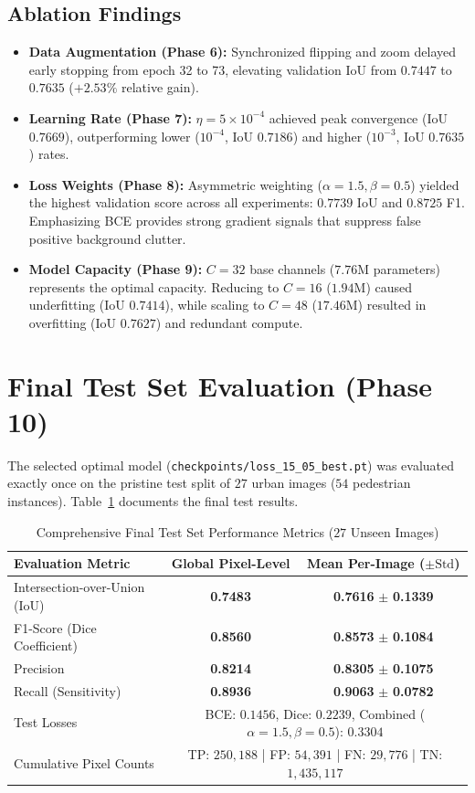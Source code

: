 \documentclass[10pt,a4paper]{report}
\begin{document}
\subsection{Ablation Findings}
\begin{itemize}
    \item \textbf{Data Augmentation (Phase 6):} Synchronized flipping and zoom delayed early stopping from epoch 32 to 73, elevating validation IoU from $0.7447$ to $0.7635$ ($+2.53\%$ relative gain).
    \item \textbf{Learning Rate (Phase 7):} $\eta = 5\times 10^{-4}$ achieved peak convergence (IoU $0.7669$), outperforming lower ($10^{-4}$, IoU $0.7186$) and higher ($10^{-3}$, IoU $0.7635$) rates.
    \item \textbf{Loss Weights (Phase 8):} Asymmetric weighting ($\alpha=1.5, \beta=0.5$) yielded the highest validation score across all experiments: $\mathbf{0.7739}$ IoU and $\mathbf{0.8725}$ F1. Emphasizing BCE provides strong gradient signals that suppress false positive background clutter.
    \item \textbf{Model Capacity (Phase 9):} $C=32$ base channels ($7.76$M parameters) represents the optimal capacity. Reducing to $C=16$ ($1.94$M) caused underfitting (IoU $0.7414$), while scaling to $C=48$ ($17.46$M) resulted in overfitting (IoU $0.7627$) and redundant compute.
\end{itemize}

\section{Final Test Set Evaluation (Phase 10)}
The selected optimal model (\texttt{checkpoints/loss\_15\_05\_best.pt}) was evaluated exactly once on the pristine test split of $27$ urban images ($54$ pedestrian instances). Table~\ref{tab:test_metrics} documents the final test results.

\begin{table}[htbp]
\centering
\small
\caption{Comprehensive Final Test Set Performance Metrics ($27$ Unseen Images)}
\label{tab:test_metrics}
\begin{tabular}{lcc}
\toprule
\textbf{Evaluation Metric} & \textbf{Global Pixel-Level} & \textbf{Mean Per-Image ($\pm \text{Std}$)} \\
\midrule
Intersection-over-Union (IoU) & \textbf{0.7483} & \textbf{0.7616} $\pm$ \textbf{0.1339} \\
F1-Score (Dice Coefficient) & \textbf{0.8560} & \textbf{0.8573} $\pm$ \textbf{0.1084} \\
Precision & \textbf{0.8214} & \textbf{0.8305} $\pm$ \textbf{0.1075} \\
Recall (Sensitivity) & \textbf{0.8936} & \textbf{0.9063} $\pm$ \textbf{0.0782} \\
\midrule
Test Losses & \multicolumn{2}{c}{BCE: $0.1456$, Dice: $0.2239$, Combined ($\alpha=1.5, \beta=0.5$): $0.3304$} \\
Cumulative Pixel Counts & \multicolumn{2}{c}{TP: $250,188$ | FP: $54,391$ | FN: $29,776$ | TN: $1,435,117$} \\
\bottomrule
\end{tabular}
\end{table}
\end{document}
